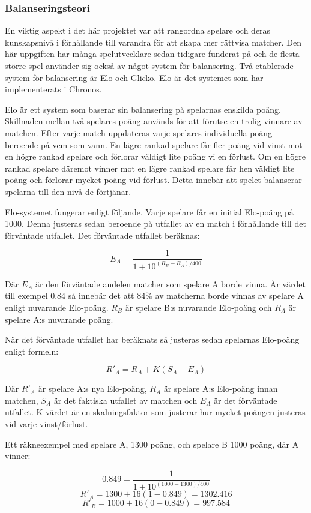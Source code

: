 \documentclass[a4paper, 11pt]{article}
\begin{document}
\subsubsection{Balanseringsteori}
En viktig aspekt i det här projektet var att rangordna spelare och deras kunskapsnivå i förhållande till varandra för att skapa mer rättvisa matcher. Den här uppgiften har många spelutvecklare sedan tidigare funderat på och de flesta större spel använder sig också av något system för balansering. Två etablerade system för balansering är Elo och Glicko. Elo är det systemet som har implementerats i Chronos.

Elo är ett system som baserar sin balansering på spelarnas enskilda poäng. Skillnaden mellan två spelares poäng används för att förutse en trolig vinnare av matchen. Efter varje match uppdateras varje spelares individuella poäng beroende på vem som vann. En lägre rankad spelare får fler poäng vid vinst mot en högre rankad spelare och förlorar väldigt lite poäng vi en förlust. Om en högre rankad spelare däremot vinner mot en lägre rankad spelare får hen väldigt lite poäng och förlorar mycket poäng vid förlust. Detta innebär att spelet balanserar spelarna till den nivå de förtjänar.

Elo-systemet fungerar enligt följande. Varje spelare får en initial Elo-poäng på 1000. Denna justeras sedan beroende på utfallet av en match i förhållande till det förväntade utfallet. Det förväntade utfallet beräknas:

$$E_A = \frac{1}{1+10^{(R_B-R_A)/400}}$$

Där $E_A$ är den förväntade andelen matcher som spelare A borde vinna. Är värdet till exempel 0.84 så innebär det att 84\% av matcherna borde vinnas av spelare A enligt nuvarande Elo-poäng. $R_B$ är spelare B:s nuvarande Elo-poäng och $R_A$ är spelare A:s nuvarande poäng.

När det förväntade utfallet har beräknats så justeras sedan spelarnas Elo-poäng enligt formeln:

$$R'_A = R_A + K(S_A-E_A)$$

Där $R'_A$ är spelare A:s nya Elo-poäng, $R_A$ är spelare A:s Elo-poäng innan matchen, $S_A$ är det faktiska utfallet av matchen och $E_A$ är det förväntade utfallet. K-värdet är en skalningsfaktor som justerar hur mycket poängen justeras vid varje vinst/förlust.

Ett räkneexempel med spelare A, 1300 poäng, och spelare B 1000 poäng, där A vinner:

$$0.849 = \frac{1}{1+10^{(1000-1300)/400}}$$
$$ R'_A = 1300 + 16(1-0.849) = 1302.416 $$
$$ R'_B = 1000 + 16(0-0.849) = 997.584 $$
\end{document}
